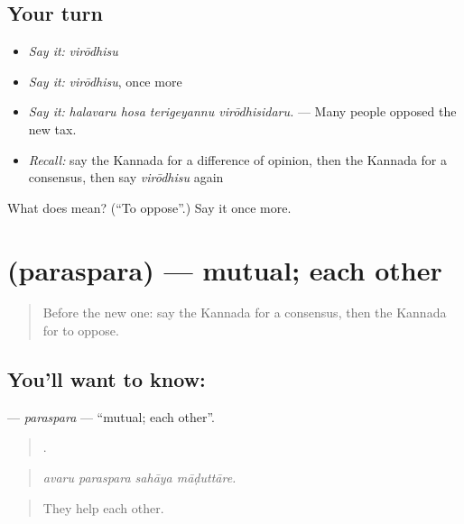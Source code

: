 \subsection*{Your turn}
\begin{itemize}
\raggedright
  \item \emph{Say it:} \emph{virōdhisu}
  \item \emph{Say it:} \emph{virōdhisu}, once more
  \item \emph{Say it:} \emph{halavaru hosa terigeyannu virōdhisidaru.} — Many people opposed the new tax.
  \item \emph{Recall:} say the Kannada for a difference of opinion, then the Kannada for a consensus, then say \emph{virōdhisu} again
\end{itemize}

\begin{tcolorbox}[breakable,colback=teal!4,colframe=teal!35!black,title={Before you move on}]
What does  mean? (\textquotedblleft{}To oppose\textquotedblright{}.) Say it once more.
\end{tcolorbox}
\section[\texorpdfstring{\kn{ಪರಸ್ಪರ} (paraspara)}{ಪರಸ್ಪರ (paraspara)}]{ (paraspara) — mutual; each other}

\label{lesson:KA-C379-paraspara}



\begin{quote}
Before the new one: say the Kannada for a consensus, then the Kannada for to oppose.
\end{quote}

\subsection*{You'll want to know: }
\textbf{} — \emph{paraspara} — \textquotedblleft{}mutual; each other\textquotedblright{}.

\begin{quote}
   .
\end{quote}

\begin{quote}
\emph{avaru paraspara sahāya māḍuttāre.}
\end{quote}

\begin{quote}
They help each other.
\end{quote}

